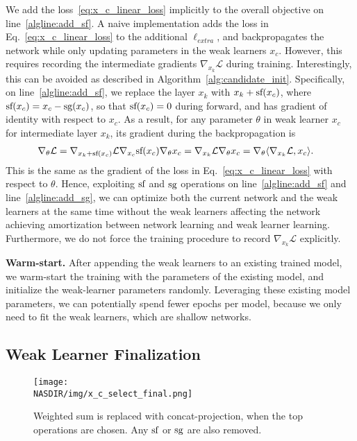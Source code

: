 We add the loss~\ref{eq:x_c_linear_loss} implicitly to the overall
objective on line~\ref{algline:add_sf}.  A naive implementation adds
the loss in Eq.~\ref{eq:x_c_linear_loss} to the additional
$\ell_{extra}$, and backpropagates the network while only updating
parameters in the weak learners $x_c$.  However, this requires recording the intermediate gradients $\nabla _{x_{k}} \mathcal{L}$
during training.  Interestingly, this can be avoided as described in Algorithm~\ref{alg:candidate_init}.  Specifically, on
line~\ref{algline:add_sf}, we replace the layer $x_k$ with $x_k +
\textrm{sf}(x_c)$, where $\textrm{sf}(x_c) = x_c -
\textrm{sg}(x_c)$, so that $\textrm{sf}(x_c) = 0$ during forward,
and has gradient of identity with respect to $x_c$. As a result, for
any parameter $\theta$ in weak learner $x_c$ for intermediate layer
$x_k$, its gradient during the backpropagation is
\begin{align}
\nabla_{\theta} \mathcal{L} &= \nabla _{x_k + \textrm{sf}(x_c)} \mathcal{L} \nabla _{x_c} \textrm{sf}(x_c) \nabla _{\theta} x_c = \nabla _{x_k}\mathcal{L} \nabla _{\theta} x_c = \nabla_{\theta} \langle \nabla_{x_{k}} \mathcal{L}, x_c \rangle.
\end{align}
This is the same as the gradient of the loss in
Eq.~\ref{eq:x_c_linear_loss} with respect to $\theta$.  Hence,
exploiting $\textrm{sf}$ and $\textrm{sg}$ operations on
line~\ref{algline:add_sf} and line~\ref{algline:add_sg}, we can
optimize both the current network and the weak learners at the same
time without the weak learners affecting the network achieving
amortization between network learning and weak learner learning.
Furthermore, we do not force the training procedure to record
$\nabla_{x_k} \mathcal{L}$ explicitly.

\textbf{Warm-start.} After appending the weak learners to an existing trained model, we warm-start the training with the parameters
of the existing model, and initialize the weak-learner parameters randomly. Leveraging these existing model parameters, 
we can potentially spend fewer epochs per model, because we only need to fit the weak learners, which are
shallow networks.


\subsection{Weak Learner Finalization}
\label{sec:candidate_finalize}

\begin{figure}[t]
\centering
    \texttt{[image: \\NASDIR/img/x\_c\_select\_final.png]}
    \caption{Weighted sum is replaced with concat-projection, when the top operations are chosen. Any $\textrm{sf}$ or $\textrm{sg}$ are also removed.}
    \label{fig:x_c_select_final}
\end{figure}

